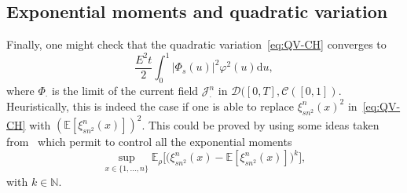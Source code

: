 \documentclass[10pt]{amsart}
\theoremstyle{definition}\newtheorem{defi}[theo]{Definition}\newtheorem{rema}[theo]{Remark}\newtheorem{exam}[theo]{Example}\newtheorem{exem}[theo]{Example}\newtheorem{nota}[theo]{Notation}
\newcommand{\bb}[1]{{\mathbb #1}}
\newcommand{\mc}[1]{{\mathcal #1}}
\renewcommand{\mc}[1]{{\mathcal #1}}
\newcommand*{\dd}{\mathrm{d}}
\newcommand*{\du}{\dd u}
\begin{document}
\subsection{Exponential moments and quadratic variation}

Finally, one might check that the quadratic variation~\eqref{eq:QV-CH} converges to
\[
\frac{E^2 t}{2} \int_0^1 |\Phi_s(u)|^2\varphi^2(u)\du,
\]
where $\Phi_\cdot$ is the limit of the current field $\mc J_\cdot^n$ in $\mc D([0,T],\mc C([0,1])$. Heuristically, this is indeed the case if one is able to replace $\xi_{sn^2}^n(x)^2$ in~\eqref{eq:QV-CH} with $(\bb E[\xi_{sn^2}^n(x)])^2$. This could be proved by using some ideas taken from~\cite[Lemma~4.3]{GLM} which permit to control all the exponential moments
\[
\sup_{x\in\{1,\dots,n\}} \bb E_\rho \big[\big(\xi_{sn^2}^n(x)-\bb E[\xi_{sn^2}^n(x)]\big)^k\big],
\]
with $k\in\mathbb N$.
\end{document}
